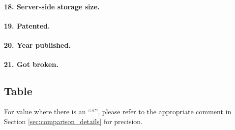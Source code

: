 \documentclass[../report.tex]{subfiles}
\begin{document}
\paragraph{18. Server-side storage size.}


\paragraph{19. Patented.}


\paragraph{20. Year published.}


\paragraph{21. Got broken.}




\subsection{Table}

For value where there is an ``*'', please refer to the appropriate comment in Section \ref{sec:comparison_details} for precision.
\end{document}
